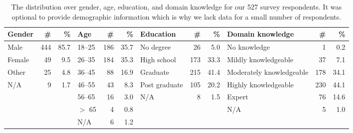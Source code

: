 \begin{table*}[t]
	\centering
	\caption{The distribution over gender, age, education, and domain knowledge
	for our 527 survey respondents.  It was optional to provide demographic
	information which is why we lack data for a small number of respondents.}
	\label{tab:survey-demo}
	\begin{tabular}{l r r | l r r | l r r | l r r}
	\toprule
	Gender & \# & \% &
	Age & \# & \% &
	Education & \# & \% &
	Domain knowledge & \# & \% \\
	\midrule
	Male   & 444 & 85.7 & 18--25 & 186 & 35.7 & No degree     &  26 & 5.0  & No knowledge             &   1 & 0.2  \\
	Female &  49 &  9.5 & 26--35 & 184 & 35.3 & High school   & 173 & 33.3 & Mildly knowledgeable     &  37 & 7.1  \\
	Other  &  25 &  4.8 & 36--45 &  88 & 16.9 & Graduate      & 215 & 41.4 & Moderately knowledgeable & 178 & 34.1 \\
	N/A    &   9 &  1.7 & 46--55 &  43 &  8.3 & Post graduate & 105 & 20.2 & Highly knowledgeable     & 230 & 44.1 \\
	       &     &      & 56--65 &  16 &  3.0 & N/A           &   8 &  1.5 & Expert                   &  76 & 14.6 \\
	       &     &      & $>$ 65 &   4 &  0.8 &               &     &      & N/A                      &   5 &  1.0 \\
	       &     &      & N/A    &   6 &  1.2 &               &     &      &                          &     & \\
	\bottomrule
	\end{tabular}
\end{table*}

